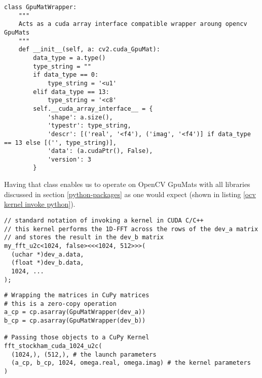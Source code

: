 \documentclass[english,11pt,a4paper,table]{article} %
\begin{document}
\begin{verbatim}
class GpuMatWrapper:
	"""
	Acts as a cuda array interface compatible wrapper aroung opencv GpuMats
	"""
	def __init__(self, a: cv2.cuda_GpuMat):
		data_type = a.type()
		type_string = ""
		if data_type == 0:
			type_string = '<u1'
		elif data_type == 13:
			type_string = '<c8'
		self.__cuda_array_interface__ = {
			'shape': a.size(),
			'typestr': type_string,
			'descr': [('real', '<f4'), ('imag', '<f4')] if data_type == 13 else [('', type_string)],
			'data': (a.cudaPtr(), False),
			'version': 3
		}
\end{verbatim}

Having that class enables us to operate on OpenCV GpuMats with all libraries discussed in section \ref{python-packages} as one would expect (shown in listing \ref{ocv kernel invoke python}).

\begin{minipage}[t]{.49\textwidth}
	\begin{verbatim}
// standard notation of invoking a kernel in CUDA C/C++
// this kernel performs the 1D-FFT across the rows of the dev_a matrix 
// and stores the result in the dev_b matrix
my_fft_u2c<1024, false><<<1024, 512>>>(
  (uchar *)dev_a.data,
  (float *)dev_b.data,
  1024, ...
);
\end{verbatim}
\end{minipage}\hfill%
\begin{minipage}[t]{.49\textwidth}
	\begin{verbatim}
# Wrapping the matrices in CuPy matrices
# this is a zero-copy operation
a_cp = cp.asarray(GpuMatWrapper(dev_a))
b_cp = cp.asarray(GpuMatWrapper(dev_b))

# Passing those objects to a CuPy Kernel
fft_stockham_cuda_1024_u2c(
  (1024,), (512,), # the launch parameters
  (a_cp, b_cp, 1024, omega.real, omega.imag) # the kernel parameters
)
\end{verbatim}
\end{minipage}%
\end{document}
